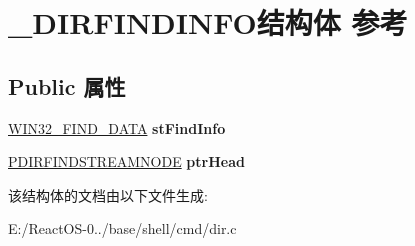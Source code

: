 \hypertarget{struct___d_i_r_f_i_n_d_i_n_f_o}{}\section{\+\_\+\+D\+I\+R\+F\+I\+N\+D\+I\+N\+F\+O结构体 参考}
\label{struct___d_i_r_f_i_n_d_i_n_f_o}
\subsection*{Public 属性}
\begin{DoxyCompactItemize}
\item 
\mbox{\label{struct___d_i_r_f_i_n_d_i_n_f_o_a415c6b08c6977fab1d0ad807cea80c10}} 
\hyperlink{struct_w_i_n32___f_i_n_d___d_a_t_a_a}{W\+I\+N32\+\_\+\+F\+I\+N\+D\+\_\+\+D\+A\+TA} {\bfseries st\+Find\+Info}
\item 
\mbox{\label{struct___d_i_r_f_i_n_d_i_n_f_o_aae80e1b7d1972cc0dc49f65991ec66ae}} 
\hyperlink{struct___d_i_r_f_i_n_d_s_t_r_e_a_m_n_o_d_e}{P\+D\+I\+R\+F\+I\+N\+D\+S\+T\+R\+E\+A\+M\+N\+O\+DE} {\bfseries ptr\+Head}
\end{DoxyCompactItemize}


该结构体的文档由以下文件生成\+:\begin{DoxyCompactItemize}
\item 
E\+:/\+React\+O\+S-\/0../base/shell/cmd/dir.\+c\end{DoxyCompactItemize}
